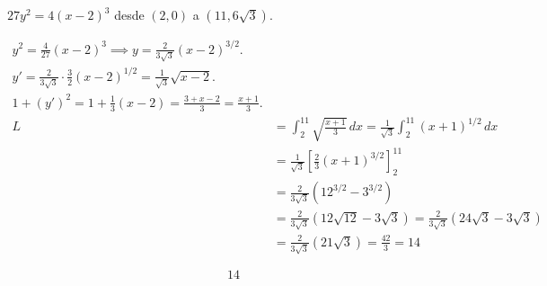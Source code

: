 $27y^2=4(x-2)^3$ desde $(2,0)$ a $(11,6\sqrt{3})$.

\nopagebreak
\begin{align*}
y^2 = \frac{4}{27}(x-2)^3 \implies y = \frac{2}{3\sqrt{3}}(x-2)^{3/2}. \\
y' = \frac{2}{3\sqrt{3}} \cdot \frac{3}{2} (x-2)^{1/2} = \frac{1}{\sqrt{3}} \sqrt{x-2}. \\
1 + (y')^2 = 1 + \frac{1}{3}(x-2) = \frac{3+x-2}{3} = \frac{x+1}{3}. \\
L &= \int_{2}^{11} \sqrt{\frac{x+1}{3}} \, dx = \frac{1}{\sqrt{3}} \int_{2}^{11} (x+1)^{1/2} \, dx \\
&= \frac{1}{\sqrt{3}} \left[ \frac{2}{3} (x+1)^{3/2} \right]_{2}^{11} \\
&= \frac{2}{3\sqrt{3}} (12^{3/2} - 3^{3/2}) \\
&= \frac{2}{3\sqrt{3}} (12\sqrt{12} - 3\sqrt{3}) = \frac{2}{3\sqrt{3}} (24\sqrt{3} - 3\sqrt{3}) \\
&= \frac{2}{3\sqrt{3}} (21\sqrt{3}) = \frac{42}{3} = 14
\end{align*}

\[
\boxed{\displaystyle 14}
\]
